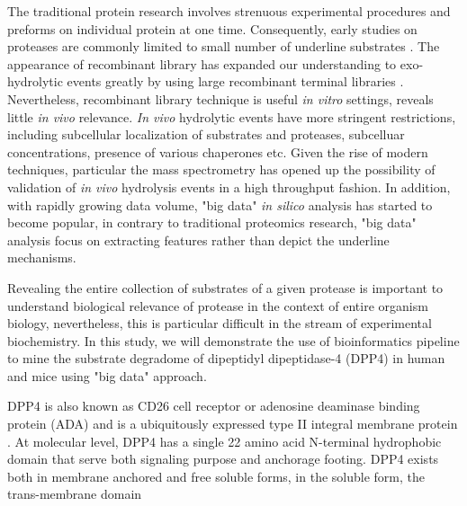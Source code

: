 The traditional protein research involves strenuous experimental procedures and preforms on individual protein at one time. Consequently, early studies on proteases are commonly limited to small number of underline substrates \cite{:1992aa}. The appearance of recombinant library has expanded our understanding to exo-hydrolytic events greatly by using large recombinant terminal libraries \cite{Gupta:2010aa}. Nevertheless, recombinant library technique is useful \textit{in vitro} settings, reveals little \textit{in vivo} relevance. \textit{In vivo} hydrolytic events have more stringent restrictions, including subcellular localization of substrates and proteases, subcelluar concentrations, presence of various chaperones etc. Given the rise of modern techniques, particular the mass spectrometry has opened up the possibility of validation of \textit{in vivo} hydrolysis events in a high throughput fashion. In addition, with rapidly growing data volume, "big data" \textit{in silico} analysis has started to become popular, in contrary to traditional proteomics research, "big data" analysis focus on extracting features rather than depict the underline mechanisms. 

Revealing the entire collection of substrates of a given protease is important to understand biological relevance of protease in the context of entire organism biology, nevertheless, this is particular difficult in the stream of experimental biochemistry. In this study, we will demonstrate the use of bioinformatics pipeline to mine the substrate degradome of dipeptidyl dipeptidase-4 (DPP4) in human and mice using "big data" approach. 

DPP4 is also known as CD26 cell receptor or adenosine deaminase binding protein (ADA) and is a ubiquitously expressed type II integral membrane protein \cite{Mentlein_1999}. At molecular level, DPP4 has a single 22 amino acid N-terminal hydrophobic domain that serve both signaling purpose and anchorage footing. \cite{Mentlein_1999, Abbott_2002} DPP4 exists both in membrane anchored and free soluble forms, in the soluble form, the trans-membrane domain 
